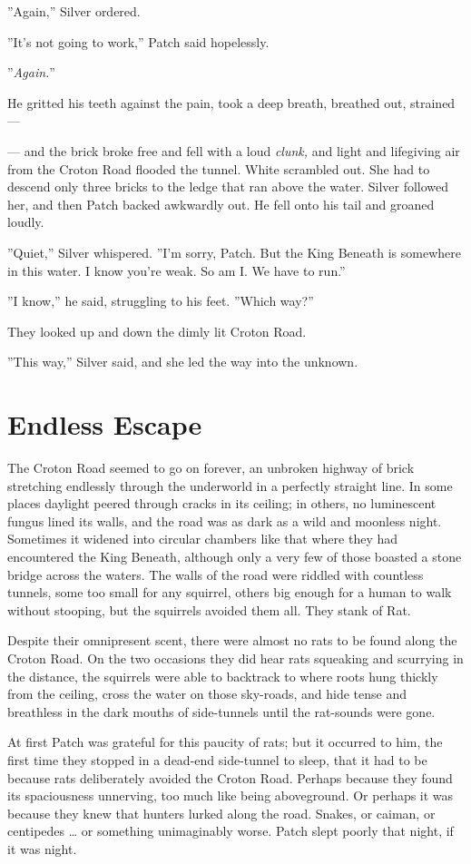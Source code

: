 \documentclass[12pt]{book}
\begin{document}
''Again,'' Silver ordered.

''It's not going to work,'' Patch said hopelessly.

''\textit{Again.}''

He gritted his teeth against the pain, took a deep breath, breathed
out, strained ---

--- and the brick broke free and fell with a loud \textit{clunk,} and
light and lifegiving air from the Croton Road flooded the
tunnel. White scrambled out. She had to descend only three bricks to
the ledge that ran above the water. Silver followed her, and then
Patch backed awkwardly out. He fell onto his tail and groaned loudly.

''Quiet,'' Silver whispered. ''I'm sorry, Patch. But the King Beneath
is somewhere in this water. I know you're weak. So am I. We have to
run.''

''I know,'' he said, struggling to his feet. ''Which way?''

They looked up and down the dimly lit Croton Road.

''This way,'' Silver said, and she led the way into the unknown.


\section{Endless Escape}

The Croton Road seemed to go on forever, an unbroken highway of brick
stretching endlessly through the underworld in a perfectly straight
line. In some places daylight peered through cracks in its ceiling; in
others, no luminescent fungus lined its walls, and the road was as
dark as a wild and moonless night. Sometimes it widened into circular
chambers like that where they had encountered the King Beneath,
although only a very few of those boasted a stone bridge across the
waters. The walls of the road were riddled with countless tunnels,
some too small for any squirrel, others big enough for a human to walk
without stooping, but the squirrels avoided them all. They stank of
Rat.

Despite their omnipresent scent, there were almost no rats to be found
along the Croton Road. On the two occasions they did hear rats
squeaking and scurrying in the distance, the squirrels were able to
backtrack to where roots hung thickly from the ceiling, cross the
water on those sky-roads, and hide tense and breathless in the dark
mouths of side-tunnels until the rat-sounds were gone.

At first Patch was grateful for this paucity of rats; but it occurred
to him, the first time they stopped in a dead-end side-tunnel to
sleep, that it had to be because rats deliberately avoided the Croton
Road. Perhaps because they found its spaciousness unnerving, too much
like being aboveground. Or perhaps it was because they knew that
hunters lurked along the road. Snakes, or caiman, or centipedes
\ldots{} or something unimaginably worse. Patch slept poorly that
night, if it was night.
\end{document}
